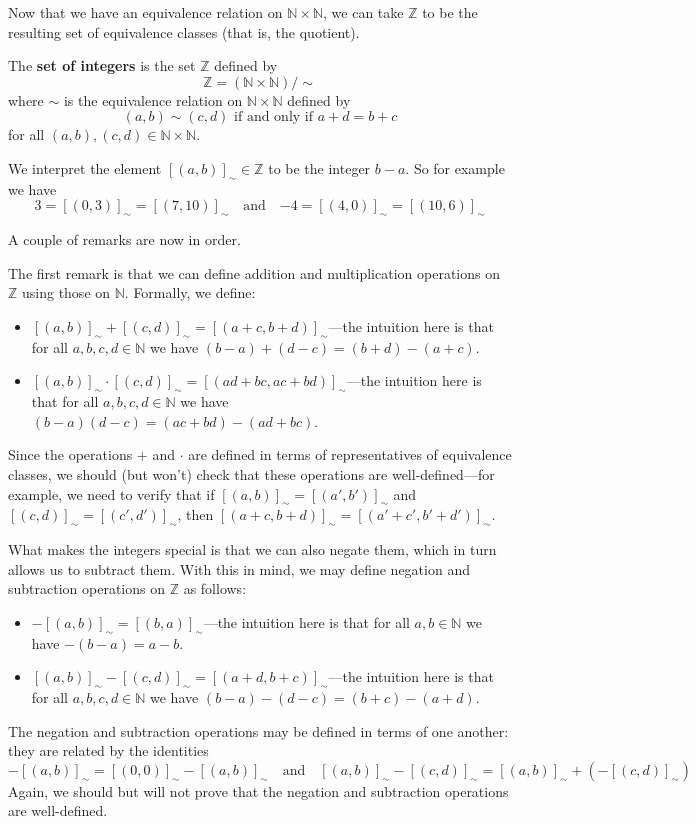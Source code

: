 Now that we have an equivalence relation on $\mathbb{N} \times \mathbb{N}$, we can take $\mathbb{Z}$ to be the resulting set of equivalence classes (that is, the quotient).

\begin{construction}
\label{cnsIntegersFromNaturalNumbers}
The \textbf{set of integers} is the set $\mathbb{Z}$ defined by
\[ \mathbb{Z} = (\mathbb{N} \times \mathbb{N})/{\sim} \]
where $\sim$ is the equivalence relation on $\mathbb{N} \times \mathbb{N}$ defined by
\[ (a,b) \sim (c,d) \text{ if and only if } a+d=b+c \]
for all $(a,b),(c,d) \in \mathbb{N} \times \mathbb{N}$.
\end{construction}

We interpret the element $[(a,b)]_{\sim} \in \mathbb{Z}$ to be the integer $b-a$. So for example we have
\[ 3 = [(0,3)]_{\sim} = [(7,10)]_{\sim} \quad \text{and} \quad {-4} = [(4,0)]_{\sim} = [(10,6)]_{\sim} \]

A couple of remarks are now in order.

The first remark is that we can define addition and multiplication operations on $\mathbb{Z}$ using those on $\mathbb{N}$. Formally, we define:
\begin{itemize}
\item $[(a,b)]_{\sim} + [(c,d)]_{\sim} = [(a+c, b+d)]_{\sim}$---the intuition here is that for all $a,b,c,d \in \mathbb{N}$ we have $(b-a) + (d-c) = (b+d) - (a+c)$.
\item $[(a,b)]_{\sim} \cdot [(c,d)]_{\sim} = [(ad+bc, ac+bd)]_{\sim}$---the intuition here is that for all $a,b,c,d \in \mathbb{N}$ we have $(b-a)(d-c) = (ac+bd) - (ad+bc)$.
\end{itemize}
Since the operations $+$ and $\cdot$ are defined in terms of representatives of equivalence classes, we should (but won't) check that these operations are well-defined---for example, we need to verify that if $[(a,b)]_{\sim} = [(a',b')]_{\sim}$ and $[(c,d)]_{\sim} = [(c',d')]_{\sim}$, then $[(a+c,b+d)]_{\sim} = [(a'+c',b'+d')]_{\sim}$.

What makes the integers special is that we can also negate them, which in turn allows us to subtract them. With this in mind, we may define negation and subtraction operations on $\mathbb{Z}$ as follows:
\begin{itemize}
\item $-[(a,b)]_{\sim} = [(b,a)]_{\sim}$---the intuition here is that for all $a,b \in \mathbb{N}$ we have $-(b-a) = a-b$.
\item $[(a,b)]_{\sim} - [(c,d)]_{\sim} = [(a+d,b+c)]_{\sim}$---the intuition here is that for all $a,b,c,d \in \mathbb{N}$ we have $(b-a) - (d-c) = (b+c) - (a+d)$.
\end{itemize}
The negation and subtraction operations may be defined in terms of one another: they are related by the identities
\[ -[(a,b)]_{\sim} = [(0,0)]_{\sim} - [(a,b)]_{\sim} \quad \text{and} \quad [(a,b)]_{\sim} - [(c,d)]_{\sim} = [(a,b)]_{\sim} + (-[(c,d)]_{\sim}) \]
Again, we should but will not prove that the negation and subtraction operations are well-defined.


